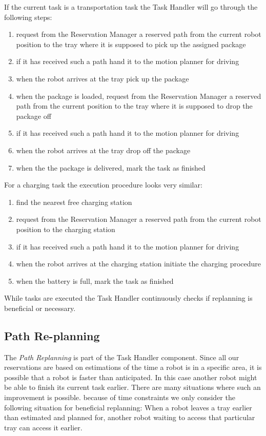 \documentclass[journal]{IEEEtran}
\begin{document}
If the current task is a transportation task the Task Handler will go through the following steps:
\begin{enumerate}
	\item request from the Reservation Manager a reserved path from the current robot position to the tray where it is supposed to pick up the assigned package
	\item if it has received such a path hand it to the motion planner for driving
	\item when the robot arrives at the tray pick up the package
	\item when the package is loaded, request from the Reservation Manager a reserved path from the current position to the tray where it is supposed to drop the package off
	\item if it has received such a path hand it to the motion planner for driving
	\item when the robot arrives at the tray drop off the package
	\item when the the package is delivered, mark the task as finished
\end{enumerate}
For a charging task the execution procedure looks very similar:
\begin{enumerate}
	\item find the nearest free charging station
	\item request from the Reservation Manager a reserved path from the current robot position to the charging station
	\item if it has received such a path hand it to the motion planner for driving
	\item when the robot arrives at the charging station initiate the charging procedure
	\item when the battery is full, mark the task as finished
\end{enumerate}
While tasks are executed the Task Handler continuously checks if replanning is beneficial or necessary.

\subsection{Path Re-planning}
\label{subsec:path_replanning}
The \textit{Path Replanning} is part of the Task Handler component.
Since all our reservations are based on estimations of the time a robot is in a specific area, it is possible that a robot is faster than anticipated. In this case another robot might be able to finish its current task earlier.
There are many situations where such an improvement is possible. 
because of time constraints we only consider the following situation for beneficial replanning:
When a robot leaves a tray earlier than estimated and planned for, another robot waiting to access that particular tray can access it earlier.
\end{document}
